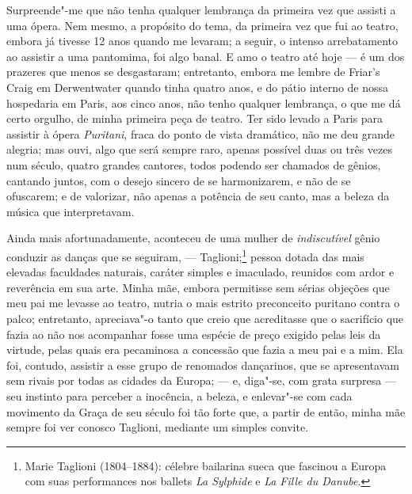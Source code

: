 Surpreende"-me que não tenha qualquer lembrança da primeira vez que
assisti a uma ópera. Nem mesmo, a propósito do tema, da primeira vez que
fui ao teatro, embora já tivesse 12 anos quando me levaram; a seguir, o
intenso arrebatamento ao assistir a uma pantomima, foi algo banal. E amo
o teatro até hoje --- é um dos prazeres que menos se desgastaram;
entretanto, embora me lembre de Friar's Craig em Derwentwater quando
tinha quatro anos, e do pátio interno de nossa hospedaria em Paris, aos
cinco anos, não tenho qualquer lembrança, o que me dá certo orgulho, de
minha primeira peça de teatro. Ter sido levado a Paris para assistir à
ópera \textit{Puritani}, fraca do ponto de vista dramático, não me deu
grande alegria; mas ouvi, algo que será sempre raro, apenas possível
duas ou três vezes num século, quatro grandes cantores, todos podendo
ser chamados de gênios, cantando juntos, com o desejo sincero de se
harmonizarem, e não de se ofuscarem; e de valorizar, não apenas a
potência de seu canto, mas a beleza da música que interpretavam.

Ainda mais afortunadamente, aconteceu de uma mulher de
\textit{indiscutível} gênio conduzir as danças que se seguiram, ---
Taglioni;\footnote{Marie Taglioni (1804--1884): célebre bailarina sueca
  que fascinou a Europa com suas performances nos ballets \textit{La
  Sylphide} e \textit{La Fille du Danube}.} pessoa dotada
das mais elevadas faculdades naturais, caráter simples e imaculado,
reunidos com ardor e reverência em sua arte. Minha mãe, embora
permitisse sem sérias objeções que meu pai me levasse ao teatro, nutria
o mais estrito preconceito puritano contra o palco; entretanto,
apreciava"-o tanto que creio que acreditasse que o sacrifício que fazia
ao não nos acompanhar fosse uma espécie de preço exigido pelas leis da
virtude, pelas quais era pecaminosa a concessão que fazia a meu pai e a
mim. Ela foi, contudo, assistir a esse grupo de renomados dançarinos,
que se apresentavam sem rivais por todas as cidades da Europa; --- e,
diga"-se, com grata surpresa --- seu instinto para perceber a inocência, a
beleza, e enlevar"-se com cada movimento da Graça de seu século foi tão
forte que, a partir de então, minha mãe sempre foi ver conosco Taglioni,
mediante um simples convite.

